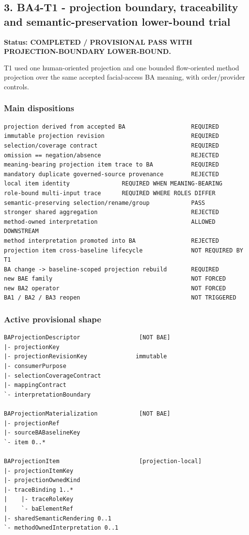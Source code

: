 \documentclass[11pt,a4paper]{article}
\begin{document}
\subsection{3. BA4-T1 - projection boundary, traceability and semantic-preservation lower-bound trial}\label{3-ba4-t1---projection-boundary-traceability-and-semantic-preservation-lower-bound-trial}

\textbf{Status: COMPLETED / PROVISIONAL PASS WITH PROJECTION-BOUNDARY LOWER-BOUND.}

T1 used one human-oriented projection and one bounded flow-oriented method projection over the same accepted facial-access BA meaning, with order/provider controls.

\subsubsection{Main dispositions}\label{main-dispositions}

\begin{verbatim}
projection derived from accepted BA                   REQUIRED
immutable projection revision                         REQUIRED
selection/coverage contract                           REQUIRED
omission == negation/absence                          REJECTED
meaning-bearing projection item trace to BA           REQUIRED
mandatory duplicate governed-source provenance        REJECTED
local item identity               REQUIRED WHEN MEANING-BEARING
role-bound multi-input trace      REQUIRED WHERE ROLES DIFFER
semantic-preserving selection/rename/group            PASS
stronger shared aggregation                           REJECTED
method-owned interpretation                           ALLOWED DOWNSTREAM
method interpretation promoted into BA                REJECTED
projection item cross-baseline lifecycle              NOT REQUIRED BY T1
BA change -> baseline-scoped projection rebuild       REQUIRED
new BAE family                                        NOT FORCED
new BA2 operator                                      NOT FORCED
BA1 / BA2 / BA3 reopen                                NOT TRIGGERED
\end{verbatim}

\subsubsection{Active provisional shape}\label{active-provisional-shape}

\begin{verbatim}
BAProjectionDescriptor                 [NOT BAE]
|- projectionKey
|- projectionRevisionKey              immutable
|- consumerPurpose
|- selectionCoverageContract
|- mappingContract
`- interpretationBoundary

BAProjectionMaterialization            [NOT BAE]
|- projectionRef
|- sourceBABaselineKey
`- item 0..*

BAProjectionItem                       [projection-local]
|- projectionItemKey
|- projectionOwnedKind
|- traceBinding 1..*
|    |- traceRoleKey
|    `- baElementRef
|- sharedSemanticRendering 0..1
`- methodOwnedInterpretation 0..1
\end{verbatim}
\end{document}
